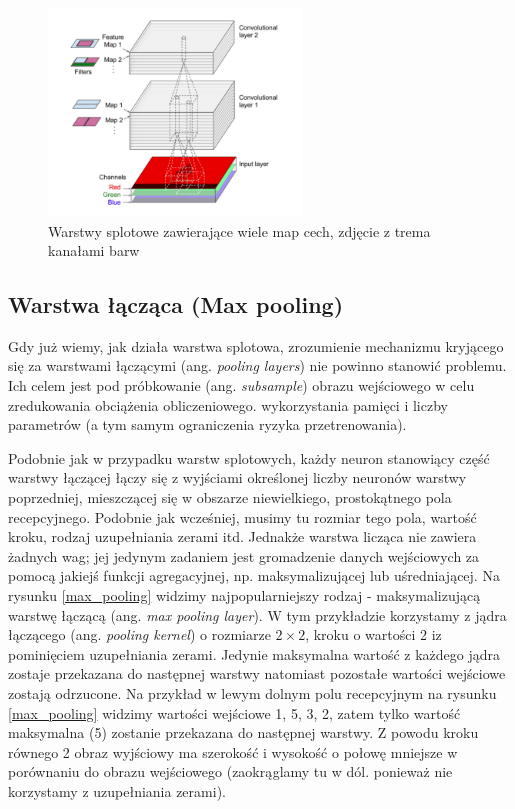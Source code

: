 \documentclass{article}
\begin{document}
\begin{figure}[H]
	\centering
	\includegraphics[width=0.6\textwidth,keepaspectratio=true]{stosy_map_cech}
	\caption{Warstwy splotowe zawierające wiele map cech, zdjęcie z trema kanałami barw \cite{geron}}
	\label{stosy_map_cech}
\end{figure}

\subsection{Warstwa łącząca (Max pooling)}
Gdy już wiemy, jak działa warstwa splotowa, zrozumienie mechanizmu kryjącego się za warstwami łączącymi (ang. \textit{pooling layers}) nie powinno stanowić problemu. Ich celem jest pod próbkowanie (ang. \textit{subsample}) obrazu wejściowego w celu zredukowania obciążenia obliczeniowego. wykorzystania pamięci i liczby parametrów (a tym samym ograniczenia ryzyka przetrenowania). \cite{geron}

Podobnie jak w przypadku warstw splotowych, każdy neuron stanowiący część warstwy łączącej łączy się z wyjściami określonej liczby neuronów warstwy poprzedniej, mieszczącej się w obszarze niewielkiego, prostokątnego pola recepcyjnego. Podobnie jak wcześniej, musimy tu rozmiar tego pola, wartość kroku, rodzaj uzupełniania zerami itd. Jednakże warstwa licząca nie zawiera żadnych wag; jej jedynym zadaniem jest gromadzenie danych wejściowych za pomocą jakiejś funkcji agregacyjnej, np. maksymalizującej lub uśredniającej. Na rysunku \ref{max_pooling} widzimy najpopularniejszy rodzaj - maksymalizującą warstwę łączącą (ang. \textit{max pooling layer}). W tym przykładzie korzystamy z jądra łączącego (ang. \textit{pooling kernel}) o rozmiarze $2 \times 2$, kroku o wartości 2 iz pominięciem uzupełniania zerami. Jedynie maksymalna wartość z każdego jądra zostaje przekazana do następnej warstwy natomiast pozostałe wartości wejściowe zostają odrzucone. Na przykład w lewym dolnym polu recepcyjnym na rysunku \ref{max_pooling} widzimy wartości wejściowe 1, 5, 3, 2, zatem tylko wartość maksymalna (5) zostanie przekazana do następnej warstwy. Z powodu kroku równego 2 obraz wyjściowy ma szerokość i wysokość o połowę mniejsze w porównaniu do obrazu wejściowego (zaokrąglamy tu w dól. ponieważ nie korzystamy z uzupełniania zerami). \cite{geron}
\end{document}
